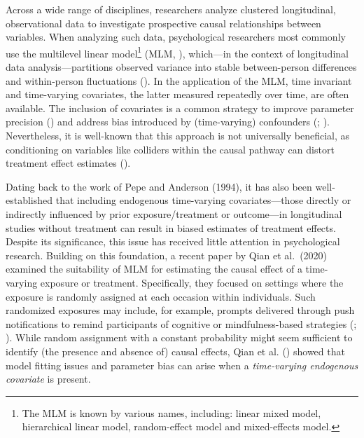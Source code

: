 \documentclass[
  11pt,
  a4paper,
]{article}
\begin{document}
Across a wide range of disciplines, researchers analyze clustered
longitudinal, observational data to investigate prospective causal
relationships between variables. When analyzing such data, psychological
researchers most commonly use the multilevel linear model\footnote{The
  MLM is known by various names, including: linear mixed model,
  hierarchical linear model, random-effect model and mixed-effects
  model.} (MLM, ),
which---in the context of longitudinal data analysis---partitions
observed variance into stable between-person differences and
within-person fluctuations (). In the application of the MLM, time invariant and
time-varying covariates, the latter measured repeatedly over time, are
often available. The inclusion of covariates is a common strategy to
improve parameter precision () and address bias introduced by (time-varying) confounders
(;
). Nevertheless, it is well-known
that this approach is not universally beneficial, as conditioning on
variables like colliders within the causal pathway can distort treatment
effect estimates ().

Dating back to the work of Pepe and Anderson (1994), it has also been
well-established that including endogenous time-varying
covariates---those directly or indirectly influenced by prior
exposure/treatment or outcome---in longitudinal studies without
treatment can result in biased estimates of treatment effects. Despite
its significance, this issue has received little attention in
psychological research. Building on this foundation, a recent paper by
Qian et al.~(2020) examined the suitability of MLM for estimating the
causal effect of a time-varying exposure or treatment. Specifically,
they focused on settings where the exposure is randomly assigned at each
occasion within individuals. Such randomized exposures may include, for
example, prompts delivered through push notifications to remind
participants of cognitive or mindfulness-based strategies
(;
). While random assignment
with a constant probability might seem sufficient to identify (the
presence and absence of) causal effects, Qian et al.
() showed that model fitting issues and
parameter bias can arise when a \emph{time-varying endogenous covariate}
is present.
\end{document}
